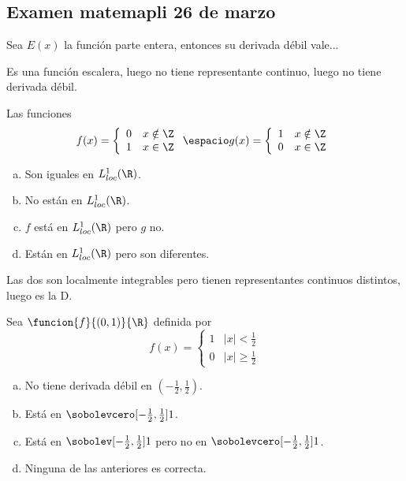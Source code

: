 \subsection*{Examen matemapli 26 de marzo}
\begin{ejercicio}
Sea $E(x)$ la función parte entera, entonces su derivada débil vale...
\end{ejercicio}
Es una función escalera, luego no tiene representante continuo, luego no tiene derivada débil.

\begin{ejercicio}
Las funciones 
\[
f(x)=\left\{
\begin{array}{cc}
0 & x\notin \Z \\
1 & x\in \Z 
\end{array}
\right. \espacio 
g(x)=\left\{
\begin{array}{cc}
1 & x\notin \Z \\
0 & x\in \Z 
\end{array}
\right.
\]
\begin{enumerate}[(a)]
\item Son iguales en $L_{loc}^1(\R)$.
\item No están en $L_{loc}^1(\R)$.
\item $f$ está en $L_{loc}^1(\R)$  pero $g$ no.
\item Están en $L_{loc}^1(\R)$ pero son diferentes.
\end{enumerate}
\end{ejercicio}

Las dos son localmente integrables pero tienen representantes continuos distintos, luego es la D.

\begin{ejercicio}
Sea $\funcion{f}{(0,1)}{\R}$ definida por
\[
f(x)=\left\{
\begin{array}{cc}
1 & |x|<\frac{1}{2} \\
0 & |x|\geq \frac{1}{2} 
\end{array}
\right.
\]
\begin{enumerate}[(a)]
\item No tiene derivada débil en $\left(-\frac{1}{2},\frac{1}{2}\right)$.
\item Está en $\sobolevcero[-\frac{1}{2},\frac{1}{2}]{1}$.
\item Está en $\sobolev[-\frac{1}{2},\frac{1}{2}]{1}$ pero no en $\sobolevcero[-\frac{1}{2},\frac{1}{2}]{1}$.
\item Ninguna de las anteriores es correcta.
\end{enumerate}
\end{ejercicio}

